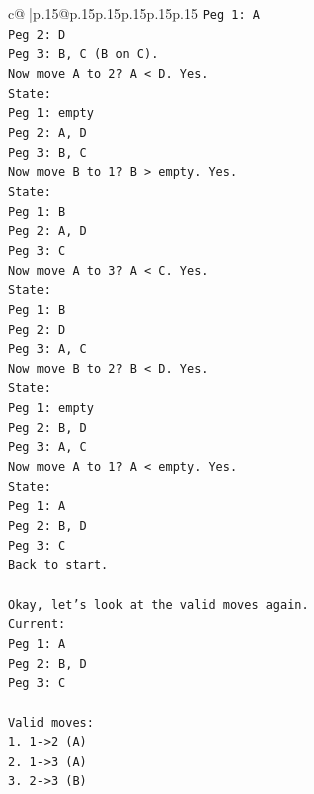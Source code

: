 \documentclass{article}
\begin{document}
{\begin{supertabular}{c@{$\;$}|p{.15\linewidth}@{}p{.15\linewidth}p{.15\linewidth}p{.15\linewidth}p{.15\linewidth}p{.15\linewidth}}
{{{\texttt{Peg 1: A} \\
\texttt{Peg 2: D} \\
\texttt{Peg 3: B, C (B on C).} \\
\texttt{Now move A to 2? A < D. Yes.} \\
\texttt{State:} \\
\texttt{Peg 1: empty} \\
\texttt{Peg 2: A, D} \\
\texttt{Peg 3: B, C} \\
\texttt{Now move B to 1? B > empty. Yes.} \\
\texttt{State:} \\
\texttt{Peg 1: B} \\
\texttt{Peg 2: A, D} \\
\texttt{Peg 3: C} \\
\texttt{Now move A to 3? A < C. Yes.} \\
\texttt{State:} \\
\texttt{Peg 1: B} \\
\texttt{Peg 2: D} \\
\texttt{Peg 3: A, C} \\
\texttt{Now move B to 2? B < D. Yes.} \\
\texttt{State:} \\
\texttt{Peg 1: empty} \\
\texttt{Peg 2: B, D} \\
\texttt{Peg 3: A, C} \\
\texttt{Now move A to 1? A < empty. Yes.} \\
\texttt{State:} \\
\texttt{Peg 1: A} \\
\texttt{Peg 2: B, D} \\
\texttt{Peg 3: C} \\
\texttt{Back to start.} \\
\\ 
\texttt{Okay, let's look at the valid moves again.} \\
\texttt{Current:} \\
\texttt{Peg 1: A} \\
\texttt{Peg 2: B, D} \\
\texttt{Peg 3: C} \\
\\ 
\texttt{Valid moves:} \\
\texttt{1. 1{-}>2 (A)} \\
\texttt{2. 1{-}>3 (A)} \\
\texttt{3. 2{-}>3 (B)} \\
}}}
\end{supertabular}}
\end{document}
